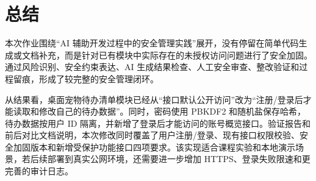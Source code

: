 \documentclass[12pt,a4paper]{ctexart}
\begin{document}
\section{总结}

本次作业围绕“AI 辅助开发过程中的安全管理实践”展开，没有停留在简单代码生成或文档补充，而是针对已有模块中实际存在的未授权访问问题进行了安全加固。通过风险识别、安全约束表达、AI 生成结果检查、人工安全审查、整改验证和过程留痕，形成了较完整的安全管理闭环。

从结果看，桌面宠物待办清单模块已经从“接口默认公开访问”改为“注册/登录后才能读取和修改自己的待办数据”。同时，密码使用 PBKDF2 和随机盐保存哈希，待办数据按用户 ID 隔离，并新增了登录后才能访问的账号概览接口。验证报告和前后对比文档说明，本次修改同时覆盖了用户注册/登录、现有接口权限校验、安全加固版本和新增受保护功能接口四项要求。该实现适合课程实验和本地演示场景，若后续部署到真实公网环境，还需要进一步增加 HTTPS、登录失败限速和更完善的审计日志。
\end{document}
